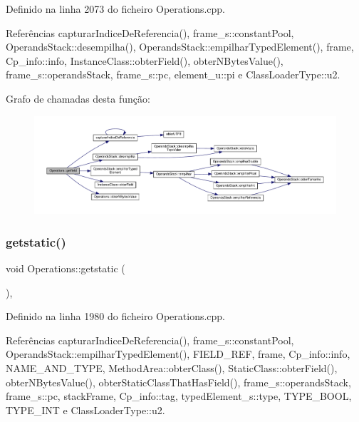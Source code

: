 Definido na linha 2073 do ficheiro Operations.\+cpp.



Referências capturar\+Indice\+De\+Referencia(), frame\+\_\+s\+::constant\+Pool, Operands\+Stack\+::desempilha(), Operands\+Stack\+::empilhar\+Typed\+Element(), frame, Cp\+\_\+info\+::info, Instance\+Class\+::obter\+Field(), obter\+N\+Bytes\+Value(), frame\+\_\+s\+::operands\+Stack, frame\+\_\+s\+::pc, element\+\_\+u\+::pi e Class\+Loader\+Type\+::u2.

Grafo de chamadas desta função\+:
\nopagebreak
\begin{figure}[H]
\begin{center}
\leavevmode
\includegraphics[width=350pt]{classOperations_a0bb399fe0f64dc21699132c092560e19_cgraph}
\end{center}
\end{figure}
\mbox{\label{classOperations_a0514422a81aa3efa5cb8b3bd1a505a68}} 
\subsubsection{\texorpdfstring{getstatic()}{getstatic()}}
{\footnotesize\ttfamily void Operations\+::getstatic (\begin{DoxyParamCaption}{ }\end{DoxyParamCaption})\hspace{0.3cm}{\ttfamily [static]}, {\ttfamily [private]}}



Definido na linha 1980 do ficheiro Operations.\+cpp.



Referências capturar\+Indice\+De\+Referencia(), frame\+\_\+s\+::constant\+Pool, Operands\+Stack\+::empilhar\+Typed\+Element(), F\+I\+E\+L\+D\+\_\+\+R\+EF, frame, Cp\+\_\+info\+::info, N\+A\+M\+E\+\_\+\+A\+N\+D\+\_\+\+T\+Y\+PE, Method\+Area\+::obter\+Class(), Static\+Class\+::obter\+Field(), obter\+N\+Bytes\+Value(), obter\+Static\+Class\+That\+Has\+Field(), frame\+\_\+s\+::operands\+Stack, frame\+\_\+s\+::pc, stack\+Frame, Cp\+\_\+info\+::tag, typed\+Element\+\_\+s\+::type, T\+Y\+P\+E\+\_\+\+B\+O\+OL, T\+Y\+P\+E\+\_\+\+I\+NT e Class\+Loader\+Type\+::u2.

